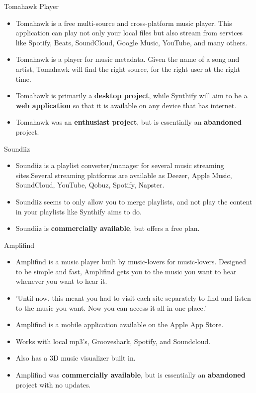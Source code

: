 Tomahawk Player \cite{reference/tomahawk}
\begin{itemize}
  \item Tomahawk is a free multi-source and cross-platform music player. This application can play not only your local files but also stream from services like Spotify, Beats, SoundCloud, Google Music, YouTube, and many others.
  \item Tomahawk is a player for music metadata. Given the name of a song and artist, Tomahawk will find the right source, for the right user at the right time.
  \item Tomahawk is primarily a \textbf{desktop project}, while Synthify will aim to be a \textbf{web application} so that it is available on any device that has internet.
  \item Tomahawk was an \textbf{enthusiast project}, but is essentially an \textbf{abandoned} project.
\end{itemize}

Soundiiz \cite{reference/soundiiz}
\begin{itemize}
  \item Soundiiz is a playlist converter/manager for several music streaming sites.Several streaming platforms are available as Deezer, Apple Music, SoundCloud, YouTube, Qobuz, Spotify, Napster.
  \item Soundiiz seems to only allow you to merge playlists, and not play the content in your playlists like Synthify aims to do.
  \item Soundiiz is \textbf{commercially available}, but offers a free plan.
\end{itemize}

Amplifind \cite{reference/amplifind}
\begin{itemize}
  \item Amplifind is a music player built by music-lovers for music-lovers. Designed to be simple and fast, Amplifind gets you to the music you want to hear whenever you want to hear it.
  \item 'Until now, this meant you had to visit each site separately to find and listen to the music you want. Now you can access it all in one place.'
  \item Amplifind is a mobile application available on the Apple App Store.
  \item Works with local mp3’s, Grooveshark, Spotify, and Soundcloud.
  \item Also has a 3D music visualizer built in.
  \item Amplifind was \textbf{commercially available}, but is essentially an \textbf{abandoned} project with no updates.
\end{itemize}

